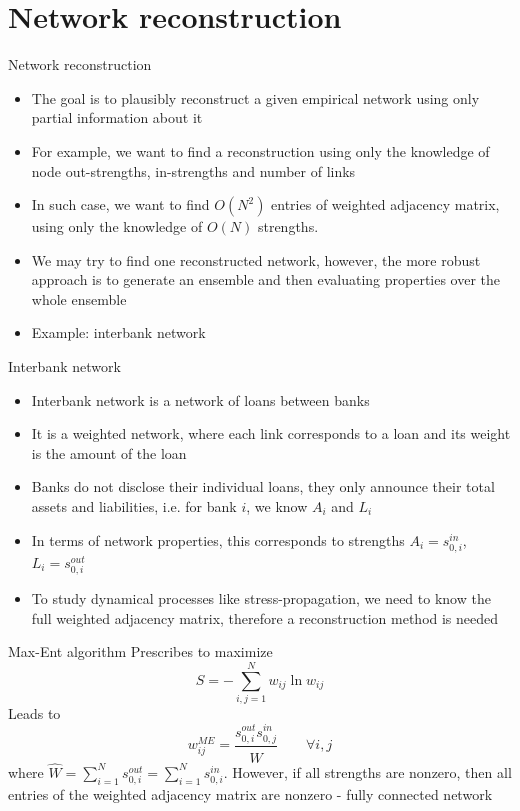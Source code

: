 \documentclass{beamer}
\begin{document}
\section{Network reconstruction}
\begin{frame}{Network reconstruction}
\begin{itemize}
    \item The goal is to plausibly reconstruct a given empirical network using only partial information about it
    \item For example, we want to find a reconstruction using only the knowledge of node out-strengths, in-strengths and number of links
    \item In such case, we want to find $O(N^2)$ entries of weighted adjacency matrix, using only the knowledge of $O(N)$ strengths.
    \item We may try to find one reconstructed network, however, the more robust approach is to generate an ensemble and then evaluating properties over the whole ensemble
    \item Example: interbank network
\end{itemize}
\end{frame}

\begin{frame}{Interbank network}
\begin{itemize}
    \item Interbank network is a network of loans between banks
    \item It is a weighted network, where each link corresponds to a loan and its weight is the amount of the loan
    \item Banks do not disclose their individual loans, they only announce their total assets and liabilities, i.e. for bank $i$, we know $A_i$ and $L_i$
    \item In terms of network properties, this corresponds to strengths $A_i = s_{0,i}^{in}$, $L_i = s_{0,i}^{out}$
    \item To study dynamical processes like stress-propagation, we need to know the full weighted adjacency matrix, therefore a reconstruction method is needed
\end{itemize}
\end{frame}

\begin{frame}{Max-Ent algorithm}
Prescribes to maximize
\begin{equation*}
    S = -\sum_{i,j=1}^N w_{ij}\ln w_{ij}
    \label{eq_max_ent_entropy}
\end{equation*}
Leads to
\begin{equation}
    w_{ij}^{ME} = \frac{s_{0,i}^{out}s_{0,j}^{in}}{\hat{W}} \qquad \forall i, j
\end{equation}
where $\hat{W} = \sum_{i=1}^N s_{0,i}^{out} = \sum_{i=1}^N s_{0,i}^{in}$.
However, if all strengths are nonzero, then all entries of the weighted adjacency matrix are nonzero - fully connected network
\end{frame}
\end{document}
